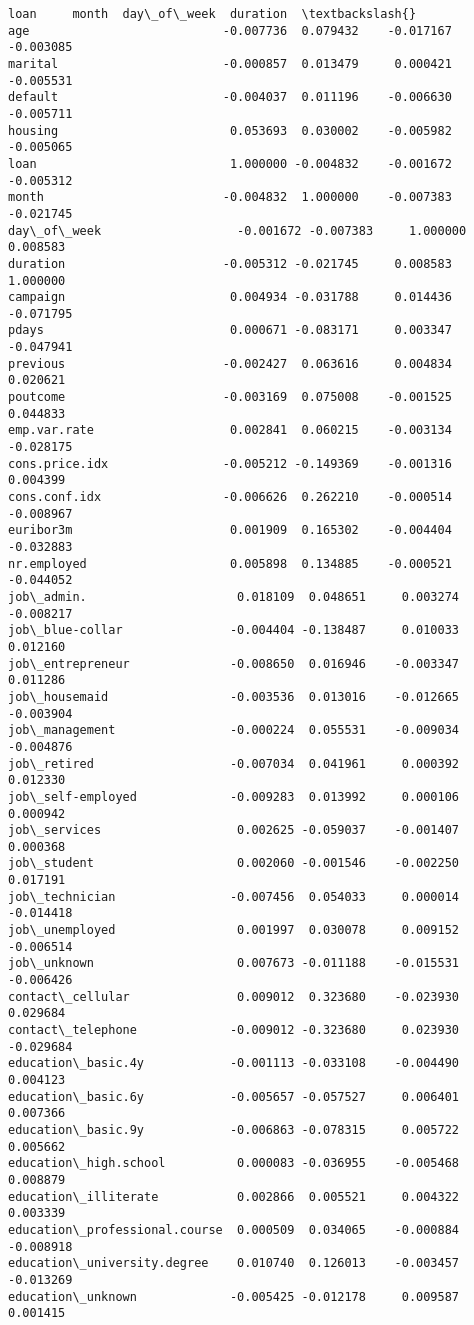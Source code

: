 \documentclass[11pt]{article}
\begin{document}
\begin{tcolorbox}[breakable, size=fbox, boxrule=.5pt, pad at break*=1mm, opacityfill=0]
\begin{Verbatim}[commandchars=\\\{\}]
                                   loan     month  day\_of\_week  duration  \textbackslash{}
age                           -0.007736  0.079432    -0.017167 -0.003085
marital                       -0.000857  0.013479     0.000421 -0.005531
default                       -0.004037  0.011196    -0.006630 -0.005711
housing                        0.053693  0.030002    -0.005982 -0.005065
loan                           1.000000 -0.004832    -0.001672 -0.005312
month                         -0.004832  1.000000    -0.007383 -0.021745
day\_of\_week                   -0.001672 -0.007383     1.000000  0.008583
duration                      -0.005312 -0.021745     0.008583  1.000000
campaign                       0.004934 -0.031788     0.014436 -0.071795
pdays                          0.000671 -0.083171     0.003347 -0.047941
previous                      -0.002427  0.063616     0.004834  0.020621
poutcome                      -0.003169  0.075008    -0.001525  0.044833
emp.var.rate                   0.002841  0.060215    -0.003134 -0.028175
cons.price.idx                -0.005212 -0.149369    -0.001316  0.004399
cons.conf.idx                 -0.006626  0.262210    -0.000514 -0.008967
euribor3m                      0.001909  0.165302    -0.004404 -0.032883
nr.employed                    0.005898  0.134885    -0.000521 -0.044052
job\_admin.                     0.018109  0.048651     0.003274 -0.008217
job\_blue-collar               -0.004404 -0.138487     0.010033  0.012160
job\_entrepreneur              -0.008650  0.016946    -0.003347  0.011286
job\_housemaid                 -0.003536  0.013016    -0.012665 -0.003904
job\_management                -0.000224  0.055531    -0.009034 -0.004876
job\_retired                   -0.007034  0.041961     0.000392  0.012330
job\_self-employed             -0.009283  0.013992     0.000106  0.000942
job\_services                   0.002625 -0.059037    -0.001407  0.000368
job\_student                    0.002060 -0.001546    -0.002250  0.017191
job\_technician                -0.007456  0.054033     0.000014 -0.014418
job\_unemployed                 0.001997  0.030078     0.009152 -0.006514
job\_unknown                    0.007673 -0.011188    -0.015531 -0.006426
contact\_cellular               0.009012  0.323680    -0.023930  0.029684
contact\_telephone             -0.009012 -0.323680     0.023930 -0.029684
education\_basic.4y            -0.001113 -0.033108    -0.004490  0.004123
education\_basic.6y            -0.005657 -0.057527     0.006401  0.007366
education\_basic.9y            -0.006863 -0.078315     0.005722  0.005662
education\_high.school          0.000083 -0.036955    -0.005468  0.008879
education\_illiterate           0.002866  0.005521     0.004322  0.003339
education\_professional.course  0.000509  0.034065    -0.000884 -0.008918
education\_university.degree    0.010740  0.126013    -0.003457 -0.013269
education\_unknown             -0.005425 -0.012178     0.009587  0.001415


\end{Verbatim}
\end{tcolorbox}
\end{document}
